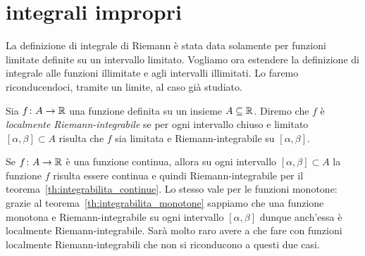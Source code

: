 \section{integrali impropri}

La definizione di integrale di Riemann è stata data solamente per funzioni
limitate definite su un intervallo
limitato.
Vogliamo ora estendere la definizione di integrale alle funzioni illimitate e
agli intervalli illimitati.
Lo faremo riconducendoci, tramite un limite, al caso già studiato.

\begin{definition}
\label{def:localmente_riemann}
Sia $f\colon A \to \mathbb R$ una funzione definita su un insieme $A\subseteq \mathbb R$.
Diremo che $f$ è \emph{localmente Riemann-integrabile} se
per ogni intervallo chiuso e limitato $[\alpha,\beta]\subset A$ risulta
che $f$ sia limitata e Riemann-integrabile su $[\alpha,\beta]$.
\end{definition}

\begin{remark}
Se $f\colon A \to \mathbb R$ è una funzione continua, allora su ogni
intervallo $[\alpha,\beta]\subset A$ la funzione $f$ risulta essere continua
e quindi Riemann-integrabile per il teorema~\ref{th:integrabilita_continue}.
Lo stesso vale per le funzioni monotone: grazie al teorema~\ref{th:integrabilita_monotone}
sappiamo che una funzione monotona e
Riemann-integrabile su ogni intervallo $[\alpha,\beta]$ dunque anch'essa
è localmente Riemann-integrabile. Sarà molto raro avere a che fare con
funzioni localmente Riemann-integrabili che non si riconducono
a questi due casi.
\end{remark}

